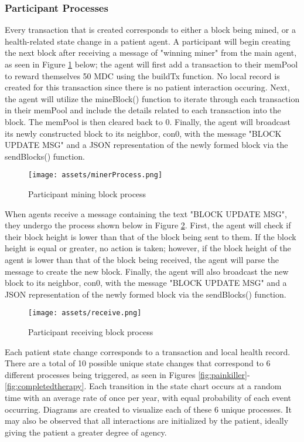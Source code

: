 \documentclass[12pt]{report}
\begin{document}
\subsubsection{Participant Processes}
Every transaction that is created corresponds to either a block being mined, or a health-related state change in a patient agent. 
A participant will begin creating the next block after receiving a message of "winning miner" from the main agent, as seen in Figure \ref{fig:minerProcess} below; the agent will first add a transaction to their memPool to reward themselves 50 MDC using the buildTx function. No local record is created for this transaction since there is no patient interaction occuring. Next, the agent will utilize the mineBlock() function to iterate through each transaction in their memPool and include the details related to each transaction into the block. The memPool is then cleared back to 0. Finally, the agent will broadcast its newly constructed block to its neighbor, con0, with the message "BLOCK UPDATE MSG" and a JSON representation of the newly formed block via the sendBlocks() function.

\begin{figure}[!h]
\texttt{[image: assets/minerProcess.png]}
\caption{Participant mining block process}
\label{fig:minerProcess}
\end{figure}

When agents receive a message containing the text "BLOCK UPDATE MSG", they undergo the process shown below in Figure \ref{fig:receive}. First, the agent will check if their block height is lower than that of the block being sent to them. If the block height is equal or greater, no action is taken; however, if the block height of the agent is lower than that of the block being received, the agent will parse the message to create the new block. Finally, the agent will also broadcast the new block to its neighbor, con0, with the message "BLOCK UPDATE MSG" and a JSON representation of the newly formed block via the sendBlocks() function.

\begin{figure}[!h]
\texttt{[image: assets/receive.png]}
\caption{Participant receiving block process}
\label{fig:receive}
\end{figure}

Each patient state change corresponds to a transaction and local health record. There are a total of 10 possible unique state changes that correspond to 6 different processes being triggered, as seen in Figures \ref{fig:painkiller}-\ref{fig:completedtherapy}. Each transition in the state chart occurs at a random time with an average rate of once per year, with equal probability of each event occurring. Diagrams are created to visualize each of these 6 unique processes. It may also be observed that all interactions are initialized by the patient, ideally giving the patient a greater degree of agency.
\end{document}
